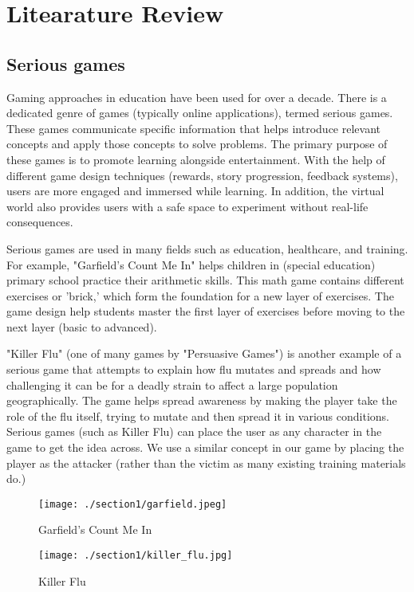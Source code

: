 \section{Litearature Review}

\subsection{Serious games}
Gaming approaches in education have been used for over a decade\cite{almeida_2012}. There is a dedicated genre of games (typically online applications), termed serious games. These games communicate specific information that helps introduce relevant concepts and apply those concepts to solve problems. The primary purpose of these games is to promote learning alongside entertainment. With the help of different game design techniques (rewards, story progression, feedback systems), users are more engaged and immersed while learning. In addition, the virtual world also provides users with a safe space to experiment without real-life consequences.

Serious games are used in many fields such as education, healthcare, and training. For example, "Garfield's Count Me In" \cite{count_me_in} helps children in (special education) primary school practice their arithmetic skills. This math game contains different exercises or 'brick,' which form the foundation for a new layer of exercises. The game design help students master the first layer of exercises before moving to the next layer (basic to advanced).

"Killer Flu" \cite{killer_flu} (one of many games by "Persuasive Games") is another example of a serious game that attempts to explain how flu mutates and spreads and how challenging it can be for a deadly strain to affect a large population geographically. The game helps spread awareness by making the player take the role of the flu itself, trying to mutate and then spread it in various conditions. Serious games (such as Killer Flu) can place the user as any character in the game to get the idea across. We use a similar concept in our game by placing the player as the attacker (rather than the victim as many existing training materials do.)


\begin{figure}[h]
    \centering
    \begin{minipage}{0.49\textwidth}
        \centering
        \texttt{[image: ./section1/garfield.jpeg]}
        \caption{Garfield's Count Me In}
    \end{minipage} \hfill
    \begin{minipage}{0.49\textwidth}
        \centering
        \texttt{[image: ./section1/killer\_flu.jpg]}
        \caption{Killer Flu}
    \end{minipage} \hfill
\end{figure}

